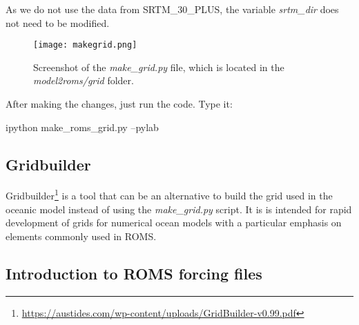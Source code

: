 \begin{tcolorbox}[enhanced,
    grow to left by   = 0cm,
    grow to right by  = 0cm,
    enlarge top by    = 0cm,
    enlarge bottom by = 0cm,
    tcbox raise base,
    boxrule           = 1.0pt,
    left              = 18mm,
    colframe          = yellow!50!black,coltext=yellow!25!black,colback=yellow!10!white,
    overlay           = {\begin{tcbclipinterior}\fill[yellow!75!blue!50!white] (frame.south west)
      rectangle node[text=white,font=\sffamily\bfseries\footnotesize,rotate=0] {ATTENTION} ([xshift=18mm]frame.north west);\end{tcbclipinterior}}]
As we do not use the data from SRTM\_30\_PLUS, the variable \textit{srtm\_dir} does not need to be modified.
\end{tcolorbox}
\bigskip

\begin{figure}[H]
    \centering
    \texttt{[image: makegrid.png]}
    \caption{Screenshot of the \textit{make\_grid.py} file, which is located in the \textit{model2roms/grid} folder.}
    \label{fazgrade}
\end{figure}
\bigskip

\noindent After making the changes, just run the code. Type it:
\bigskip

\begin{bashcode}
ipython make_roms_grid.py --pylab
\end{bashcode}
\bigskip

\subsection{Gridbuilder}
\bigskip

Gridbuilder\textcolor{bleu_cite}{\textit{}\footnote{\textcolor{bleu_cite}{\href{https://austides.com/wp-content/uploads/GridBuilder-v0.99.pdf}{https://austides.com/wp-content/uploads/GridBuilder-v0.99.pdf}}}}
is a tool that can be an alternative to build the grid used in the oceanic model instead of using the \textit{make\_grid.py} script. It is is intended for rapid development of grids for numerical ocean models
with a particular emphasis on elements commonly used in ROMS. 

\subsection{Introduction to ROMS forcing files}
\bigskip

